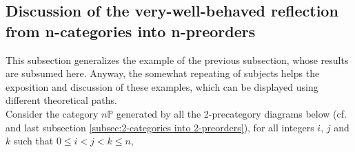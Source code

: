 \documentclass[12pt,a4paper]{amsart}
\theoremstyle{definition}
\begin{document}

\subsection{Discussion of the very-well-behaved reflection from n-categories into n-preorders}\label{subsec:n-categories into n-preorders}

This subsection generalizes the example of the previous subsection, whose results are subsumed here. Anyway, the somewhat repeating of subjects helps the exposition and discussion of these examples, which can be displayed using different theoretical paths.\\

Consider the category $n\mathbb{P}$ generated by all the 2-precategory diagrams below (cf.\ \cite[\S 10]{X:nml} and last subsection \ref{subsec:2-categories into 2-preorders}), for all integers $i$, $j$ and $k$ such that $0\leq i<j<k\leq n$,

\end{document}
